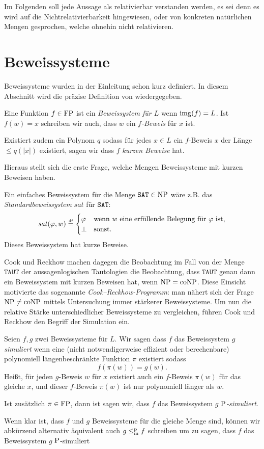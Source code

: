 Im Folgenden soll jede Aussage als relativierbar verstanden werden, es sei denn es wird auf die Nichtrelativierbarkeit hingewiesen, oder von konkreten natürlichen Mengen gesprochen, welche ohnehin nicht relativieren.


\section{Beweissysteme}\label{sec:prelim-ps}

Beweissysteme wurden in der Einleitung schon kurz definiert. In diesem Abschnitt wird die präzise Definition von \textcite{cook_relative_1979} wiedergegeben.
\begin{definition}
Eine Funktion $f\in \FP$ ist ein \emph{Beweissystem für $L$} wenn $\img(f)=L$.
Ist $f(w)=x$ schreiben wir auch, dass $w$ ein \emph{$f$-Beweis} für $x$ ist.

Existiert zudem ein Polynom $q$ sodass für jedes $x\in L$ ein $f$-Beweis $x$ der Länge $\leq q(|x|)$ existiert, sagen wir dass $f$ \emph{kurzen Beweise} hat.
\end{definition}
Hieraus stellt sich die erste Frage, welche Mengen Beweissysteme mit kurzen Beweisen haben.

Ein einfaches Beweissystem für die Menge $\mathtt{SAT}\in\NP$ wäre z.B. das \emph{Standardbeweissystem} $\mathit{sat}$ für $\mathtt{SAT}$:
\[ \mathit{sat}(\phi, w) \defeq \begin{cases} \phi & \text{wenn $w$ eine erfüllende Belegung für $\phi$ ist,} \\ \bot & \text{sonst.} \end{cases} \]
Dieses Beweissystem hat kurze Beweise.

Cook und Reckhow machen dagegen die Beobachtung im Fall von der Menge $\mathtt{TAUT}$ der aussagenlogischen Tautologien die Beobachtung, dass $\mathtt{TAUT}$ genau dann ein Beweissystem mit kurzen Beweisen hat, wenn $\NP=\coNP$.
Diese Einsicht motivierte das sogenannte \emph{Cook–Reckhow-Programm}: man nähert sich der Frage  $\NP\neq \coNP$ mittels Untersuchung immer stärkerer Beweissysteme.
Um nun die relative Stärke unterschiedlicher Beweissysteme zu vergleichen, führen Cook und Reckhow den Begriff der Simulation ein.
\begin{definition}
    Seien $f,g$ zwei Beweissysteme für $L$. Wir sagen dass $f$ das Beweissystem $g$ \emph{simuliert} wenn eine (nicht notwendigerweise effizient oder berechenbare) polynomiell längenbeschränkte Funktion $\pi$  existiert sodass 
    \[ f(\pi(w))=g(w). \]
    Heißt, für jeden $g$-Beweis $w$ für $x$ existiert auch ein $f$-Beweis $\pi(w)$ für das gleiche $x$, und dieser $f$-Beweis $\pi(w)$ ist nur polynomiell länger als $w$.

    Ist zusätzlich $\pi\in\FP$, dann ist sagen wir, dass $f$ das Beweissystem $g$ \emph{$\P$-simuliert}.
\end{definition}
Wenn klar ist, dass $f$ und $g$ Beweissysteme für die gleiche Menge sind, können wir abkürzend alternativ äquivalent auch $g\leqmp f$ schreiben um zu sagen, dass $f$ das Beweissystem $g$ $\P$-simuliert


